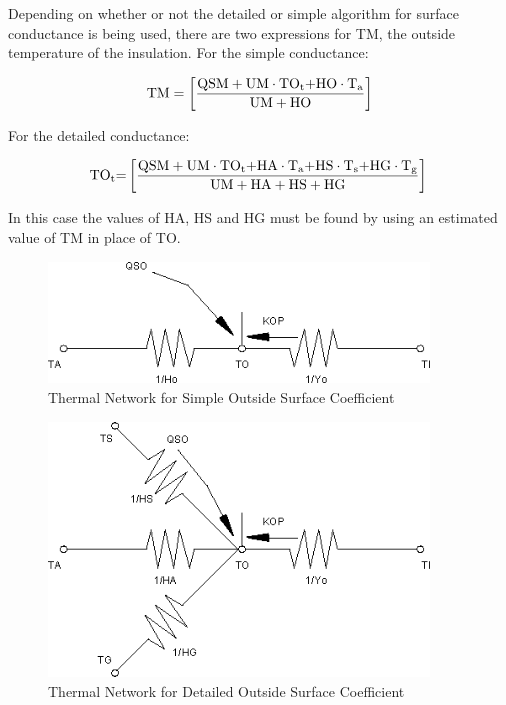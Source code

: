 Depending on whether or not the detailed or simple algorithm for surface conductance is being used, there are two expressions for TM, the outside temperature of the insulation. For the simple conductance:

\begin{equation}
{\rm{TM}} = \left[ {\frac{{{\rm{QSM + UM}}\cdot {\rm{T}}{{\rm{O}}_{\rm{t}}}{\rm{ + HO}}\cdot {{\rm{T}}_{\rm{a}}}}}{{{\rm{UM + HO}}}}} \right]
\label{eq:OutTempMovableInsulation}
\end{equation}

For the detailed conductance:

\begin{equation}
{\rm{T}}{{\rm{O}}_{\rm{t}}}{\rm{ = }}\left[ {\frac{{{\rm{QSM}} + {\rm{UM}}\cdot {\rm{T}}{{\rm{O}}_{\rm{t}}}{\rm{ + HA}}\cdot {{\rm{T}}_{\rm{a}}}{\rm{ + HS}}\cdot {{\rm{T}}_{\rm{s}}}{\rm{ + HG}}\cdot {{\rm{T}}_{\rm{g}}}}}{{{\rm{UM + HA + HS + HG}}}}} \right]{\rm{  }}
\label{eq:TOtEquationDetailedConductance}
\end{equation}

In this case the values of HA, HS and HG must be found by using an estimated value of TM in place of TO.

\begin{figure}[hbtp] %
\centering
\includegraphics[width=0.9\textwidth, height=0.9\textheight, keepaspectratio=true]{media/image420.png}
\caption{Thermal Network for Simple Outside Surface Coefficient \protect \label{fig:thermal-network-for-simple-outside-surface}}
\end{figure}

\begin{figure}[hbtp] %
\centering
\includegraphics[width=0.9\textwidth, height=0.9\textheight, keepaspectratio=true]{media/image421.png}
\caption{Thermal Network for Detailed Outside Surface Coefficient \protect \label{fig:thermal-network-for-detailed-outside-surface}}
\end{figure}

